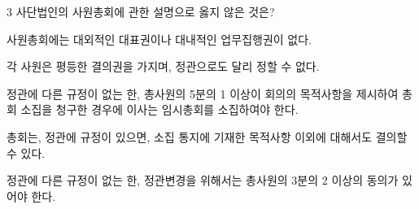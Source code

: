 \begin{question}{3}
사단법인의 사원총회에 관한 설명으로 옳지 않은 것은?
\begin{choices}
  \item 사원총회에는 대외적인 대표권이나 대내적인 업무집행권이 없다.
  \item 각 사원은 평등한 결의권을 가지며, 정관으로도 달리 정할 수 없다.
  \item 정관에 다른 규정이 없는 한, 총사원의 5분의 1 이상이 회의의 목적사항을 제시하여 총회 소집을 청구한 경우에 이사는 임시총회를 소집하여야 한다.
  \item 총회는, 정관에 규정이 있으면, 소집 통지에 기재한 목적사항 이외에 대해서도 결의할 수 있다.
  \item 정관에 다른 규정이 없는 한, 정관변경을 위해서는 총사원의 3분의 2 이상의 동의가 있어야 한다.
\end{choices}
\end{question}
